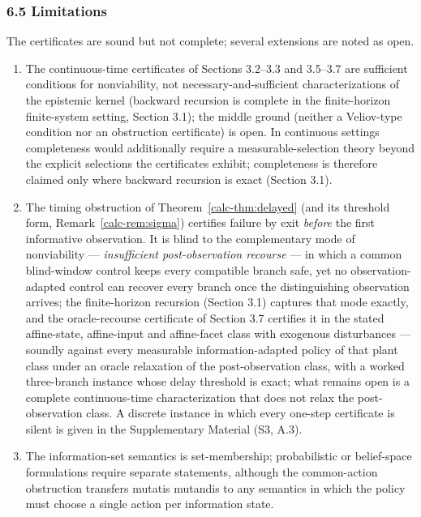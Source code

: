 \documentclass[10pt,twocolumn]{article}
\theoremstyle{definition}
\providecommand{\tightlist}{\setlength{\itemsep}{0pt}\setlength{\parskip}{0pt}}
\begin{document}
\subsubsection{6.5 Limitations}\label{calc-limitations}

The certificates are sound but not complete; several extensions are noted as open.

\begin{enumerate}
\def\labelenumi{(\roman{enumi})}
\tightlist
\item
  The continuous-time certificates of Sections 3.2--3.3 and 3.5--3.7 are sufficient conditions for nonviability, not necessary-and-sufficient characterizations of the epistemic kernel (backward recursion is complete in the finite-horizon finite-system setting, Section 3.1); the middle ground (neither a Veliov-type condition nor an obstruction certificate) is open. In
continuous settings completeness would additionally require a
measurable-selection theory beyond the explicit selections the
certificates exhibit; completeness is therefore claimed only where
backward recursion is exact (Section 3.1).
\item
  The timing obstruction of Theorem~\ref{calc-thm:delayed} (and its threshold form, Remark~\ref{calc-rem:sigma}) certifies failure by exit \emph{before} the first informative observation. It is blind to the complementary mode of nonviability --- \emph{insufficient post-observation recourse} --- in which a common blind-window control keeps every compatible branch safe, yet no observation-adapted control can recover every branch once the distinguishing observation arrives; the finite-horizon recursion (Section 3.1) captures that mode exactly, and the oracle-recourse certificate of Section 3.7 certifies it in the stated affine-state, affine-input and affine-facet class with exogenous disturbances --- soundly against every measurable information-adapted policy of that plant class under an oracle relaxation of the post-observation class, with a worked three-branch instance whose delay threshold is exact; what remains open is a complete continuous-time characterization that does not relax the post-observation class. A discrete instance in which every one-step certificate is silent is given in the Supplementary Material (S3, A.3).
\item
  The information-set semantics is set-membership; probabilistic or belief-space formulations require separate statements, although the common-action obstruction transfers mutatis mutandis to any semantics in which the policy must choose a single action per information state.

\end{enumerate}
\end{document}
